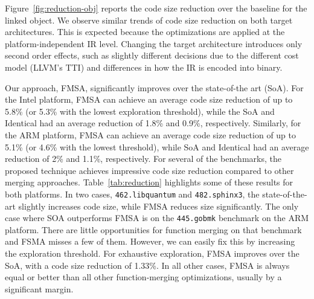 

Figure~\ref{fig:reduction-obj} reports the code size reduction over the baseline for the linked object. %
We observe similar trends of code size reduction on both target architectures. This is expected because the
optimizations are applied at the platform-independent IR level. Changing the target architecture introduces only second order effects,
such as slightly different decisions due to the different cost model (LLVM's TTI) and differences in how the IR is encoded into binary.

Our approach, FMSA, significantly improves over the state-of-the art (SoA). For the Intel platform, FMSA can achieve an average code size
reduction of up to 5.8\% (or 5.3\% with the lowest exploration threshold), while the SoA and Identical had an average reduction of 1.8\% and 0.9\%,
respectively. Similarly, for the ARM platform, FMSA can achieve an average code size reduction of up to 5.1\% (or 4.6\% with the lowest
threshold), while SoA and Identical had an average reduction of 2\% and 1.1\%, respectively. For several of the benchmarks, the
proposed technique achieves impressive code size reduction compared to other merging approaches. Table~\ref{tab:reduction} highlights
some of these results for both platforms. In two cases, \texttt{462.libquantum} and \texttt{482.sphinx3}, the state-of-the-art slightly
increases code size, while FMSA reduces size significantly.  The only case where SOA outperforms FMSA is on the \texttt{445.gobmk}
benchmark on the ARM platform. There are little opportunities for function merging on that benchmark and FSMA misses a few of them.
However, we can easily fix this by increasing the exploration threshold. For exhaustive exploration, FMSA improves over the SoA,
with a code size reduction of 1.33\%. In all other cases, FMSA is always equal or better than all other function-merging optimizations, usually by a significant margin.

